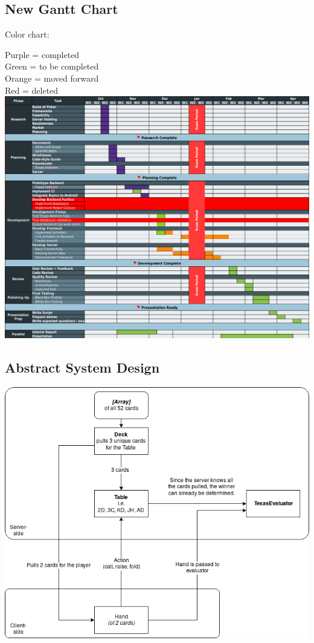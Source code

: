 \documentclass[11pt]{article}
\begin{document}
\newpage
\subsection{New Gantt Chart}

Color chart:

Purple = completed \\
Green  = to be completed\\
Orange = moved forward\\
Red = deleted\\

\includegraphics[width=\textwidth]{modified_gantt}


\newpage
\subsection{Abstract System Design}

\includegraphics[width=\textwidth]{wholesystem}
\end{document}
